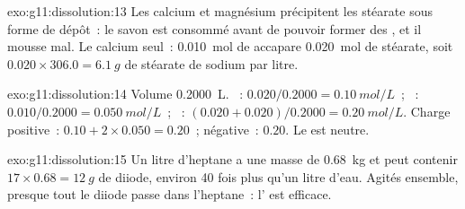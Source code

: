 \begin{solution}{exo:g11:dissolution:13}
Les  calcium et magnésium précipitent les  stéarate sous forme
de dépôt~: le savon est consommé avant de pouvoir former des , et
il mousse mal. Le calcium seul~: \qty{0.010}{mol} de 
accapare \qty{0.020}{mol} de stéarate, soit $0.020 \times 306.0 =
\qty{6.1}{g}$ de stéarate de sodium par litre.
\end{solution}

\begin{solution}{exo:g11:dissolution:14}
Volume \qty{0.2000}{L}. ~: $0.020 / 0.2000 = \qty{0.10}{mol/L}$~;
~: $0.010 / 0.2000 = \qty{0.050}{mol/L}$~; ~:
$(0.020 + 0.020) / 0.2000 = \qty{0.20}{mol/L}$. Charge positive~:
$0.10 + 2 \times 0.050 = 0.20$~; négative~: $0.20$. Le  est
neutre.
\end{solution}

\begin{solution}{exo:g11:dissolution:15}
Un litre d'heptane a une masse de \qty{0.68}{kg} et peut contenir
$17 \times 0.68 = \qty{12}{g}$ de diiode, environ 40 fois plus qu'un
litre d'eau. Agités ensemble, presque tout le diiode passe dans
l'heptane~: l' est efficace.
\end{solution}

